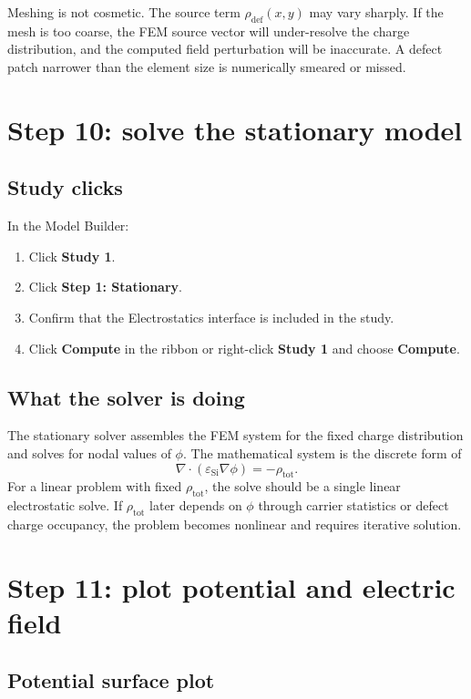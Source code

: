 \documentclass[11pt]{article}
\newcommand{\epss}{\varepsilon_{\mathrm{Si}}}
\begin{document}
Meshing is not cosmetic. The source term $\rho_{\mathrm{def}}(x,y)$ may vary sharply. If the mesh is too coarse, the FEM source vector will under-resolve the charge distribution, and the computed field perturbation will be inaccurate. A defect patch narrower than the element size is numerically smeared or missed.

\section{Step 10: solve the stationary model}

\subsection{Study clicks}

In the Model Builder:
\begin{enumerate}[leftmargin=2em]
\item Click \textbf{Study 1}.
\item Click \textbf{Step 1: Stationary}.
\item Confirm that the Electrostatics interface is included in the study.
\item Click \textbf{Compute} in the ribbon or right-click \textbf{Study 1} and choose \textbf{Compute}.
\end{enumerate}

\subsection{What the solver is doing}

The stationary solver assembles the FEM system for the fixed charge distribution and solves for nodal values of $\phi$. The mathematical system is the discrete form of
\begin{equation}
\nabla\cdot(\epss\nabla\phi)=-\rho_{\mathrm{tot}}.
\end{equation}
For a linear problem with fixed $\rho_{\mathrm{tot}}$, the solve should be a single linear electrostatic solve. If $\rho_{\mathrm{tot}}$ later depends on $\phi$ through carrier statistics or defect charge occupancy, the problem becomes nonlinear and requires iterative solution.

\section{Step 11: plot potential and electric field}

\subsection{Potential surface plot}
\end{document}
